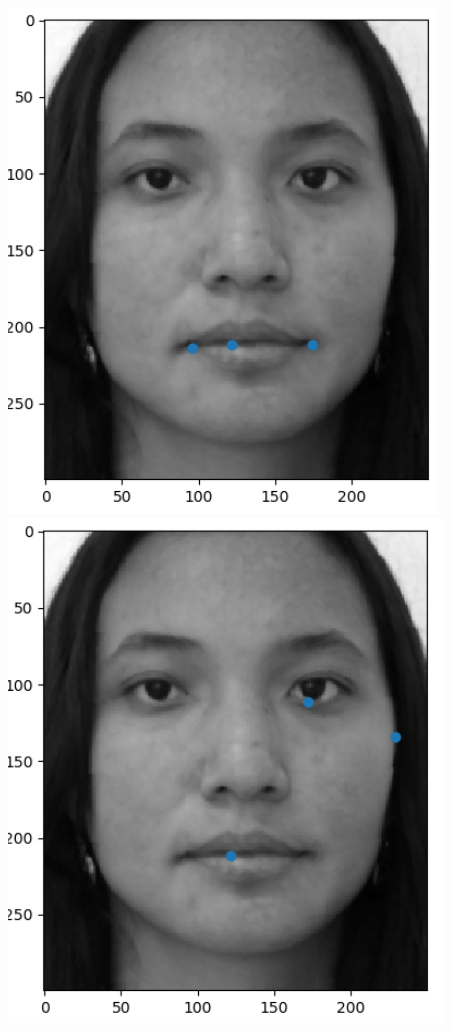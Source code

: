 \documentclass[a4paper, 10pt]{article}
\begin{document}
\begin{itemize}
\begin{center}
	\includegraphics[scale=0.8]{mouth_points.PNG}
	\hspace*{1cm}
	\includegraphics[scale=0.8]{max_var_points.PNG}
\end{center}


\end{itemize}
\end{document}

